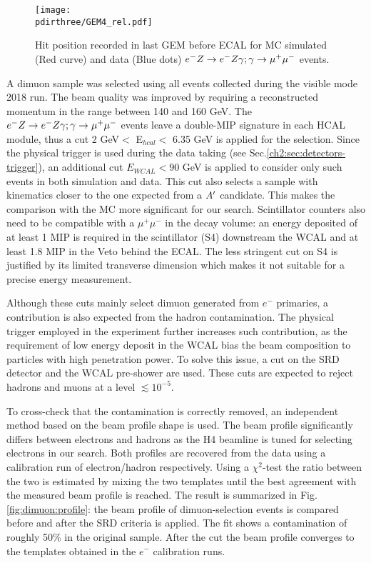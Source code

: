 \begin{figure}[tbh!]
  \begin{center}
    \texttt{[image: \\pdirthree/GEM4\_rel.pdf]}
  \end{center}

  \caption[Hit position of $\emu$ in GEM MC-DATA]{Hit position recorded in last GEM before ECAL for MC simulated (Red curve) and data (Blue dots) $\emu$ events.}
  \label{fig:dimuon:gemspectra}
\end{figure}
  

A dimuon sample was selected using all events collected during the visible mode 2018 run. The beam quality was improved by requiring a reconstructed momentum in the range between 140 and 160 GeV. The $\emu$ events leave a double-MIP signature in each HCAL module, thus a cut 2 GeV$<$ E$_{hcal} <$ 6.35 GeV is applied for the selection. Since the physical trigger is used during the data taking (see Sec.\ref{ch2:sec:detectors-trigger}), an additional cut $E_{WCAL} < 90$ GeV is applied to consider only such events in both simulation and data. This cut also selects a sample with kinematics closer to the one expected from a $A'$ candidate. This makes the comparison with the MC more significant for our search. Scintillator counters also need to be compatible with a $\mu^+ \mu^-$ in the decay volume: an energy deposited of at least 1 MIP is required in the scintillator (S4) downstream the WCAL and at least 1.8 MIP in the Veto behind the ECAL. The less stringent cut on S4 is justified by its limited transverse dimension which makes it not suitable for a precise energy measurement.

Although these cuts mainly select dimuon generated from $e^-$ primaries, a contribution is also expected from the hadron contamination. The physical trigger employed in the experiment further increases such contribution, as the requirement of low energy deposit in the WCAL bias the beam composition to particles with high penetration power. To solve this issue, a cut on the SRD detector and the WCAL pre-shower are used. These cuts are expected to reject hadrons and muons at a level $\lesssim10^{-5}$.

To cross-check that the contamination is correctly removed, an independent method based on the beam profile shape is used. The beam profile significantly differs between electrons and hadrons as the H4 beamline is tuned for selecting electrons in our search. Both profiles are recovered from the data using a calibration run of electron/hadron respectively. Using a  $\chi^2$-test the ratio between the two is estimated by mixing the two templates until the best agreement with the measured beam profile is reached. The result is summarized in Fig.\ref{fig:dimuon:profile}: the beam profile of dimuon-selection events is compared before and after the SRD criteria is applied. The fit shows a contamination of roughly 50\% in the original sample. After the cut the beam profile converges to the templates obtained in the $e^-$ calibration runs.

